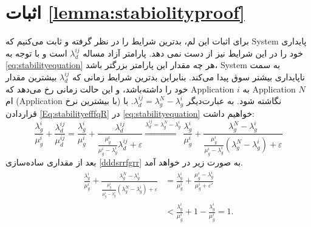 \section{اثبات \autoref{lemma:stabiolityproof}}
\label{sec:proofoflemmastability}
برای اثبات این لم، بدترین شرایط را در نظر گرفته و ثابت می‌کنیم که
\gls{System} 
پایداری خود را در این شرایط نیز از دست نمی دهد. پارامتر آزاد مساله 
 $\lambda_{d}^{ij}$
 است و با توجه به 
 \eqref{eq:stabilityequation}
 هر چه مقدار این پارامتر بزرگتر باشد، \gls{System} به سمت ناپایداری بیشتر سوق پیدا می‌کند. بنابراین بدترین شرایط زمانی که 
  $\lambda_{d}^{ij}$
 بیشترین مقدار خود را داشته‌باشد، و این حالت زمانی رخ می‌دهد که 
 \gls{Application} $i$ به \gls{Application} $N$ ام (\gls{Application} با بیشترین نرخ)
 نگاشته شود. به عبارت‌دیگر
$\lambda_{d}^{ij}=\lambda_{g}^{N}-\lambda_{g}^{i}$.
با قراردادن
\eqref{Eq:stabilityefffqR} در \eqref{eq:stabilityequation}
خواهیم داشت:
\begin{equation}
\frac{\lambda_{g}^{i}}{\mu_{g}^{i}} + \frac{\lambda_{d}^{ij}}{\mu_d^{ij}} =
\frac{\lambda_{g}^{i}}{\mu_{g}^{i}} +  \frac{\lambda_{d}^{ij}}{
\frac{\mu_{g}^{i}}{\mu_{g}^{i}-\lambda_{g}^{i}}\lambda_{d}^{ij}+\varepsilon} 	 \stackrel{\lambda_{d}^{ij}= \lambda_{g}^{N}-\lambda_{g}^{i}}{\Longrightarrow} 
\frac{\lambda_{g}^{i}}{\mu_{g}^{i}} +  \frac{\lambda_{g}^{N}-\lambda_{g}^{i}}{
\frac{\mu_{g}^{i}}{\mu_{g}^{i}-\lambda_{g}^{i}}(\lambda_{g}^{N}-\lambda_{g}^{i})+\varepsilon}
\label{dddsrrfgrr}
\end{equation}
بعد از مقداری ساده‌سازی 
\eqref{dddsrrfgrr}
به صورت زیر در خواهد آمد.
\begin{align}
\frac{\lambda_{g}^{i}}{\mu_{g}^{i}} +  \frac{\lambda_{g}^{N}-\lambda_{g}^{i}}{
\frac{\mu_{g}^{i}}{\mu_{g}^{i}-\lambda_{g}^{i}}(\lambda_{g}^{N}-\lambda_{g}^{i})+\varepsilon} & = 	\frac{\lambda_{g}^{i}}{\mu_{g}^{i}} + \frac{\mu_{g}^{i}-\lambda_{g}^{i}}{\mu_{g}^{i}+\varepsilon'}\nonumber\\
& < \frac{\lambda_{g}^{i}}{\mu_{g}^{i}} + 1 - \frac{\lambda_{g}^{i}}{\mu_{g}^{i}}=1.
\end{align}
